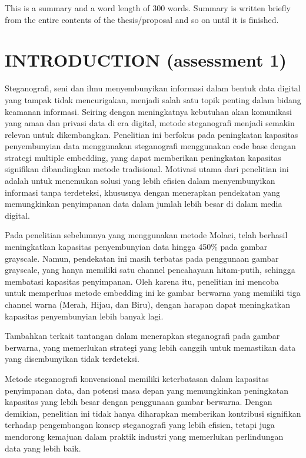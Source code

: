 \documentclass{ittelkom}
\begin{document}

{This is a summary and a word length of 300 words. Summary is written briefly from the entire contents of the thesis/proposal and so on until it is finished.}

\newpage
\section{INTRODUCTION \color{red} (assessment 1)}
Steganografi, seni dan ilmu menyembunyikan informasi dalam bentuk data digital yang tampak tidak mencurigakan, menjadi salah satu topik penting dalam bidang keamanan informasi. Seiring dengan meningkatnya kebutuhan akan komunikasi yang aman dan privasi data di era digital, metode steganografi menjadi semakin relevan untuk dikembangkan. Penelitian ini berfokus pada peningkatan kapasitas penyembunyian data menggunakan steganografi menggunakan code base dengan strategi multiple embedding, yang dapat memberikan peningkatan kapasitas signifikan dibandingkan metode tradisional. Motivasi utama dari penelitian ini adalah untuk menemukan solusi yang lebih efisien dalam menyembunyikan informasi tanpa terdeteksi, khususnya dengan menerapkan pendekatan yang memungkinkan penyimpanan data dalam jumlah lebih besar di dalam media digital.

Pada penelitian sebelumnya yang menggunakan metode Molaei, telah berhasil meningkatkan kapasitas penyembunyian data hingga 450\% pada gambar grayscale. Namun, pendekatan ini masih terbatas pada penggunaan gambar grayscale, yang hanya memiliki satu channel pencahayaan hitam-putih, sehingga membatasi kapasitas penyimpanan. Oleh karena itu, penelitian ini mencoba untuk memperluas metode embedding ini ke gambar berwarna yang memiliki tiga channel warna (Merah, Hijau, dan Biru), dengan harapan dapat meningkatkan kapasitas penyembunyian lebih banyak lagi.

Tambahkan terkait tantangan dalam menerapkan steganografi pada gambar berwarna, yang memerlukan strategi yang lebih canggih untuk memastikan data yang disembunyikan tidak terdeteksi.

Metode steganografi konvensional memiliki keterbatasan dalam kapasitas penyimpanan data, dan potensi masa depan yang memungkinkan peningkatan kapasitas yang lebih besar dengan penggunaan gambar berwarna. Dengan demikian, penelitian ini tidak hanya diharapkan memberikan kontribusi signifikan terhadap pengembangan konsep steganografi yang lebih efisien, tetapi juga mendorong kemajuan dalam praktik industri yang memerlukan perlindungan data yang lebih baik.
\end{document}
